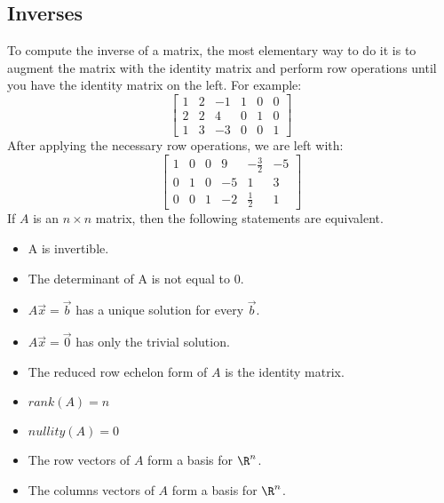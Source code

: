 \documentclass{math}
\begin{document}
\subsection*{Inverses}
To compute the inverse of a matrix, the most elementary way to do it is to
augment the matrix with the identity matrix and perform row operations until
you have the identity matrix on the left. For example:
\[ \begin{bmatrix}
  1 & 2 & -1 & 1 & 0 & 0 \\
  2 & 2 & 4 & 0 & 1 & 0 \\
  1 & 3 & -3 & 0 & 0 & 1
\end{bmatrix} \]
After applying the necessary row operations, we are left with:
\[ \begin{bmatrix}
  1 & 0 & 0 & 9 & -\frac{3}{2} & -5 \\
  0 & 1 & 0 & -5 & 1 & 3 \\
  0 & 0 & 1 & -2 & \frac{1}{2} & 1
\end{bmatrix} \]
If \( A \) is an \( n\times n \) matrix, then the following statements are
equivalent.
\begin{itemize}
  \item A is invertible.
  \item The determinant of A is not equal to 0.
  \item \( A\vec{x} = \vec{b} \) has a unique solution for every \( \vec{b} \).
  \item \( A\vec{x} = \vec{0} \) has only the trivial solution.
  \item The reduced row echelon form of \( A \) is the identity matrix.
  \item \( rank(A) = n \)
  \item \( nullity(A) = 0 \)
  \item The row vectors of \( A \) form a basis for \( \R^n \).
  \item The columns vectors of \( A \) form a basis for \( \R^n \).
\end{itemize}
\end{document}
